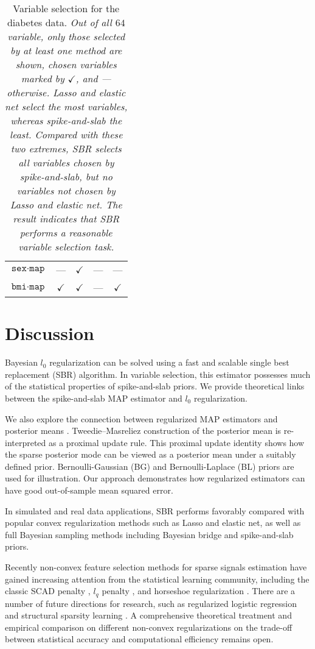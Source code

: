 \documentclass[11pt]{article}%
\numberwithin{equation}{section}
\theoremstyle{plain}
\begin{document}
\begin{table}[h!]
\begin{tabular}{| C || C  | C | C | C |}
 $\texttt{sex}\cdot\texttt{map}$ 		& ---		   & $\checkmark$ & --- 		 & ---			\\
 $\texttt{bmi}\cdot\texttt{map}$ 		& $\checkmark$ & $\checkmark$ & --- 		 & $\checkmark$ \\
\hline
\end{tabular}
\caption{Variable selection for the diabetes data.  \textit{Out of all $64$ variable, only those selected by at least one method are shown, chosen variables marked by $\checkmark$, and --- otherwise.  Lasso and elastic net select the most variables, whereas spike-and-slab the least.  Compared with these two extremes, SBR selects all variables chosen by spike-and-slab, but no variables not chosen by Lasso and elastic net.  The result indicates that SBR performs a reasonable variable selection task.}}\label{table:sel}
\end{table}




\section{Discussion \label{dis}}

Bayesian $l_0$ regularization can be solved using a fast and scalable single best replacement (SBR) algorithm.  In variable selection, this estimator possesses much of the statistical properties of spike-and-slab priors.  We provide theoretical links between the spike-and-slab MAP estimator and $l_0$ regularization.

We also explore the connection between regularized MAP estimators and posterior means \citep{strawderman2013}.  Tweedie--Masreliez construction of the posterior mean is re-interpreted as a proximal update rule.  This proximal update identity shows how the sparse posterior mode can be viewed as a posterior mean under a suitably defined prior.  Bernoulli-Gaussian (BG) and Bernoulli-Laplace (BL) priors are used for illustration.  Our approach demonstrates how regularized estimators can have good out-of-sample mean squared error.

In simulated and real data applications, SBR performs favorably compared with popular convex regularization methods such as Lasso and elastic net, as well as full Bayesian sampling methods including Bayesian bridge and spike-and-slab priors.

Recently non-convex feature selection methods for sparse signals estimation have gained increasing attention from the statistical learning community, including the classic SCAD penalty \citep{fan2001}, $l_q$ penalty \citep{marjanovic2013}, and horseshoe regularization \citep{bhadra2017horseshoe}.  There are a number of future directions for research, such as regularized logistic regression \citep{gramacy2012} and structural sparsity learning \citep{polson2017proximal}.  A comprehensive theoretical treatment and empirical comparison on different non-convex regularizations on the trade-off between statistical accuracy and computational efficiency remains open.


\end{document}
